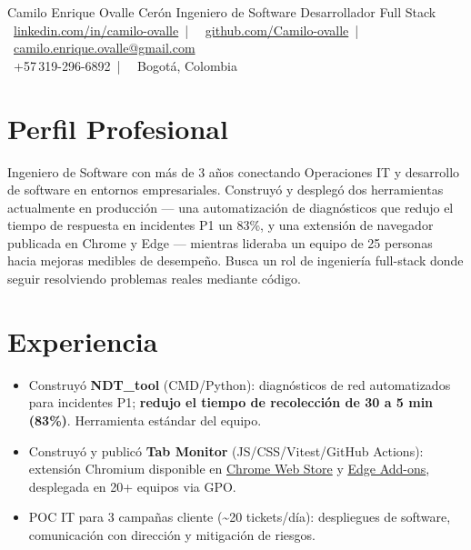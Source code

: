 \documentclass[10pt]{article}
\begin{document}
\cvheader
  {Camilo Enrique Ovalle Cerón}
  {Ingeniero de Software \textbar{} Desarrollador Full Stack}
  {%
    \faLinkedin~\href{https://linkedin.com/in/camilo-ovalle}{linkedin.com/in/camilo-ovalle}~|~%
    \faGithub~\href{https://github.com/Camilo-ovalle}{github.com/Camilo-ovalle}~|~%
    \faEnvelope~\href{mailto:camilo.enrique.ovalle@gmail.com}{camilo.enrique.ovalle@gmail.com}\\[1pt]%
    \faPhone~+57\,319-296-6892~|~%
    \faMapMarker*~Bogotá, Colombia%
  }

\section{Perfil Profesional}

Ingeniero de Software con más de 3 años conectando Operaciones IT y desarrollo de
software en entornos empresariales. Construyó y desplegó dos herramientas actualmente
en producción — una automatización de diagnósticos que redujo el tiempo de respuesta
en incidentes P1 un 83\%, y una extensión de navegador publicada en Chrome y Edge —
mientras lideraba un equipo de 25 personas hacia mejoras medibles de desempeño.
Busca un rol de ingeniería full-stack donde seguir resolviendo problemas reales mediante código.

\section{Experiencia}

\begin{itemize}
  \item Construyó \textbf{NDT\_tool} (CMD/Python): diagnósticos de red automatizados para incidentes
        P1; \textbf{redujo el tiempo de recolección de 30 a 5 min (83\%)}. Herramienta estándar del equipo.
  \item Construyó y publicó \textbf{Tab Monitor} (JS/CSS/Vitest/GitHub Actions): extensión Chromium
        disponible en \href{https://chromewebstore.google.com/detail/tab-monitor/apbgiakfdalcpmnopopopookdceecnfj}{Chrome Web Store}
        y \href{https://microsoftedge.microsoft.com/addons/detail/tab-monitor/aidfbccdmjdoloknpoiacciagffokjcb}{Edge Add-ons},
        desplegada en 20+ equipos via GPO.
  \item POC IT para 3 campañas cliente (\textasciitilde20 tickets/día): despliegues de software,
        comunicación con dirección y mitigación de riesgos.
\end{itemize}
\end{document}
